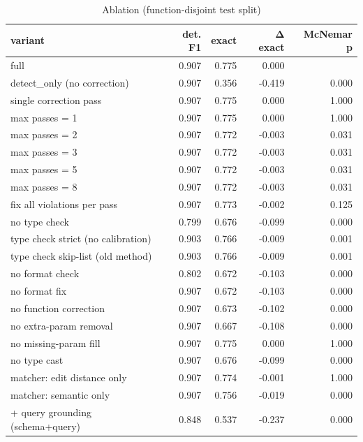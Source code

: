 \begin{table}[t]
\centering
\caption{Ablation (function-disjoint test split)}
\label{tab:ablation_function_disjoint}
\begin{tabular}{lrrrr}
\hline
variant & det. F1 & exact & Δ exact & McNemar p \\
\hline
full & 0.907 & 0.775 & 0.000 &  \\
detect\_only (no correction) & 0.907 & 0.356 & -0.419 & 0.000 \\
single correction pass & 0.907 & 0.775 & 0.000 & 1.000 \\
max passes = 1 & 0.907 & 0.775 & 0.000 & 1.000 \\
max passes = 2 & 0.907 & 0.772 & -0.003 & 0.031 \\
max passes = 3 & 0.907 & 0.772 & -0.003 & 0.031 \\
max passes = 5 & 0.907 & 0.772 & -0.003 & 0.031 \\
max passes = 8 & 0.907 & 0.772 & -0.003 & 0.031 \\
fix all violations per pass & 0.907 & 0.773 & -0.002 & 0.125 \\
no type check & 0.799 & 0.676 & -0.099 & 0.000 \\
type check strict (no calibration) & 0.903 & 0.766 & -0.009 & 0.001 \\
type check skip-list (old method) & 0.903 & 0.766 & -0.009 & 0.001 \\
no format check & 0.802 & 0.672 & -0.103 & 0.000 \\
no format fix & 0.907 & 0.672 & -0.103 & 0.000 \\
no function correction & 0.907 & 0.673 & -0.102 & 0.000 \\
no extra-param removal & 0.907 & 0.667 & -0.108 & 0.000 \\
no missing-param fill & 0.907 & 0.775 & 0.000 & 1.000 \\
no type cast & 0.907 & 0.676 & -0.099 & 0.000 \\
matcher: edit distance only & 0.907 & 0.774 & -0.001 & 1.000 \\
matcher: semantic only & 0.907 & 0.756 & -0.019 & 0.000 \\
+ query grounding (schema+query) & 0.848 & 0.537 & -0.237 & 0.000 \\
\hline
\end{tabular}
\end{table}
